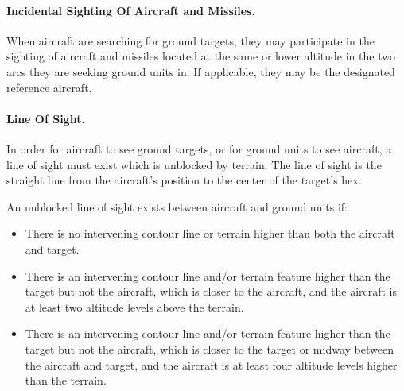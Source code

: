 

\paragraph{Incidental Sighting Of Aircraft and Missiles.} When aircraft are searching for ground targets, they may participate in the sighting of aircraft and missiles located at the same or lower altitude in the two arcs they are seeking ground units in. If applicable, they may be the designated reference aircraft.

\paragraph{Line Of Sight.} 
\label{rule:line-of-sight}
In order for aircraft to see ground targets, or for ground units to see aircraft, a line of sight must exist which is unblocked by terrain. The line of sight is the straight line from the aircraft's position to the center of the target's hex.

An unblocked line of sight exists between aircraft and ground units if:

\begin{itemize}
    \item There is no intervening contour line or terrain higher than both the aircraft and target.
    \item There is an intervening contour line and/or terrain feature higher than the target but not the aircraft, which is closer to the aircraft, and the aircraft is at least two altitude levels above the terrain.
    \item There is an intervening contour line and/or terrain feature higher than the target but not the aircraft, which is closer to the target or midway between the aircraft and target, and the aircraft is at least four altitude levels higher than the terrain.
\end{itemize}

